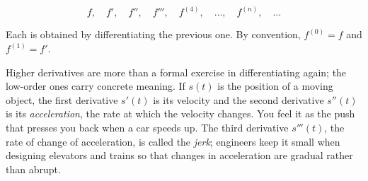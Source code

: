 \documentclass[a4paper,12pt,oneside]{memoir}
\begin{document}
\[ f,\quad f',\quad f'',\quad f''',\quad f^{(4)},\quad \ldots,\quad f^{(n)},\quad \ldots \]

Each is obtained by differentiating the previous one. By convention, \(f^{(0)} = f\) and \(f^{(1)} = f'\).

Higher derivatives are more than a formal exercise in differentiating again; the low-order ones carry concrete meaning. If \(s(t)\) is the position of a moving object, the first derivative \(s'(t)\) is its velocity and the second derivative \(s''(t)\) is its \emph{acceleration}, the rate at which the velocity changes. You feel it as the push that presses you back when a car speeds up. The third derivative \(s'''(t)\), the rate of change of acceleration, is called the \emph{jerk}; engineers keep it small when designing elevators and trains so that changes in acceleration are gradual rather than abrupt.
\end{document}
